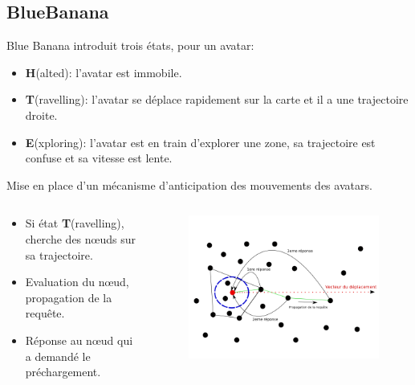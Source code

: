 \documentclass{beamer}
\begin{document}
  \subsection{BlueBanana}
  \begin{frame}
	 Blue Banana introduit trois états, pour un avatar:
        \begin{itemize}
                \item \textbf{H}(alted): l'avatar est immobile.
                \item \textbf{T}(ravelling): l'avatar se déplace rapidement sur la carte et il a une trajectoire droite.
                \item \textbf{E}(xploring): l'avatar est en train d'explorer une zone, sa trajectoire est confuse et sa vitesse est lente.
        \end{itemize}
  \end{frame}

  \begin{frame}
	Mise en place d'un mécanisme d'anticipation des mouvements des avatars.
	\begin{columns}
	  \begin{column}{5cm}
		\begin{itemize}
		  \item Si état \textbf{T}(ravelling), cherche des nœuds sur sa trajectoire.
		  \item Evaluation du nœud, propagation de la requête.
		  \item Réponse au nœud qui a demandé le préchargement.
		\end{itemize}
	  \end{column}
	\begin{column}{5cm}
	\begin{figure}
        \includegraphics[scale=0.3]{./Ressources/Images/propagation_algo.png}\\
        \label{Propa_Algo}
        \end{figure}
	\end{column}
	\end{columns}

  \end{frame}
\end{document}
